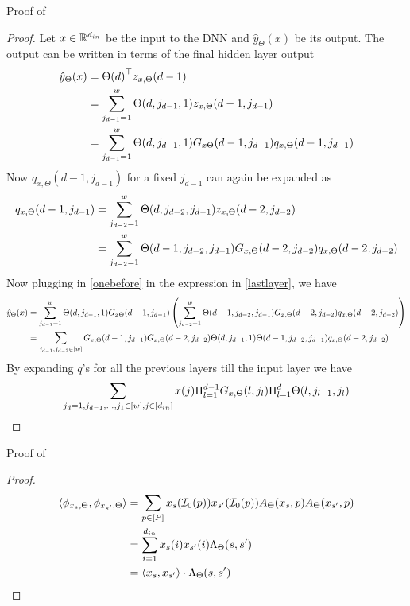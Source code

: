 \begin{appendix}
Proof of 
\begin{proof}
Let $x\in\mathbb{R}^{d_{in}}$ be the input to the DNN and $\hat{y}_{\Theta}(x)$ be its output. The output can be written in terms of the final hidden layer output 
\begin{align}
\hat{y}_{\Theta}(x)&={\Theta(d)}^\top z_{x,\Theta}(d-1)\nonumber\\
&=\sum_{j_{d-1}=1}^w\Theta(d, j_{d-1},1)  z_{x,\Theta}(d-1,j_{d-1})\nonumber\\
\label{lastlayer}&=\sum_{j_{d-1}=1}^w\Theta(d, j_{d-1},1)  G_{x\Theta}(d-1,j_{d-1}) q_{x,\Theta}(d-1,j_{d-1})
\end{align}
Now $q_{x,\Theta}(d-1,j_{d-1})$ for a fixed $j_{d-1}$ can again be expanded as
\begin{align}
q_{x,\Theta}(d-1,j_{d-1})&= \sum_{j_{d-2}=1}^w \Theta(d, j_{d-2}, j_{d-1}) z_{x,\Theta}(d-2,j_{d-2})\nonumber\\
\label{onebefore}&=\sum_{j_{d-2}=1}^w \Theta(d-1, j_{d-2}, j_{d-1}) G_{x,\Theta}(d-2,j_{d-2})q_{x,\Theta}(d-2,j_{d-2})
\end{align}
Now plugging in \eqref{onebefore} in the expression in \eqref{lastlayer}, we have
\begin{align}
\hat{y}_{\Theta}(x)&=\sum_{j_{d-1}=1}^w\Theta(d, j_{d-1},1)  G_{x\Theta}(d-1,j_{d-1}) \left(\sum_{j_{d-2}=1}^w \Theta(d-1, j_{d-2}, j_{d-1}) G_{x,\Theta}(d-2,j_{d-2})q_{x,\Theta}(d-2,j_{d-2})\right)\nonumber\\
&=\sum_{j_{d-1}, j_{d-2}\in[w]} G_{x,\Theta}(d-1,j_{d-1}) G_{x,\Theta}(d-2,j_{d-2}) \Theta(d, j_{d-1},1) \Theta(d-1, j_{d-2}, j_{d-1}) q_{x,\Theta}(d-2,j_{d-2})\nonumber\\
\end{align}
By expanding $q$'s for all the previous layers till the input layer we have
\begin{align}
\sum_{j_{d}=1, j_{d-1},\ldots,j_{1}\in[w], j\in[d_{in}]} x(j) \Pi_{l=1}^{d-1}G_{x,\Theta}(l,j_{l}) \Pi_{l=1}^{d}\Theta(l, j_{l-1}, j_{l}) \nonumber
\end{align}
\end{proof}

Proof of 
\begin{proof}
\begin{align}
\langle \phi_{x_s,\Theta},\phi_{x_{s'},\Theta}\rangle&=\sum_{p\in[P]}x_s(\mathcal{I}_0(p))x_{s'}(\mathcal{I}_0(p))A_{\Theta}(x_s,p)A_{\Theta}(x_{s'},p)\nonumber\\
&=\sum_{i=1}^{d_{in}}x_s(i)x_{s'}(i)\Lambda_{\Theta}(s,s')\nonumber\\
&=\langle x_s,x_{s'}\rangle\cdot\Lambda_{\Theta}(s,s')
\end{align}
\end{proof}


\end{appendix}

